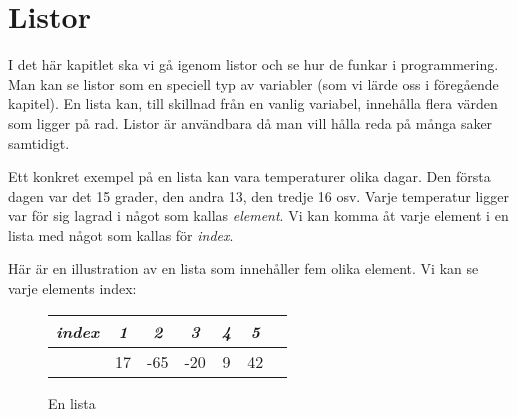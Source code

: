 %
%
\chapter{Listor}\label{ch:listor}I det här kapitlet ska vi gå igenom listor och se hur de funkar i programmering. Man kan se listor som en speciell typ av variabler (som vi lärde oss i föregående kapitel). En lista kan, till skillnad från en vanlig variabel, innehålla flera värden som ligger på rad. Listor är användbara då man vill hålla reda på många saker samtidigt.


Ett konkret exempel på en lista kan vara temperaturer olika dagar. Den första dagen var det 15 grader, den andra 13, den tredje 16 osv. Varje temperatur ligger var för sig lagrad i något som kallas \emph{element}. Vi kan komma åt varje element i en lista med något som kallas för \emph{index}.

Här är en illustration av en lista som innehåller fem olika element. Vi kan se varje elements index:

\begin{figure}[H]
\begin{center}
\caption{En lista}
\begin{tabular}{l|*{5}{c}r}
\emph{index} & \emph{1} & \emph{2} & \emph{3} & \emph{4} & \emph{5} \\
\hline
\emph{}       & 17 & -65 & -20 & 9 & 42  \\
\end{tabular}
\end{center}
\end{figure}

